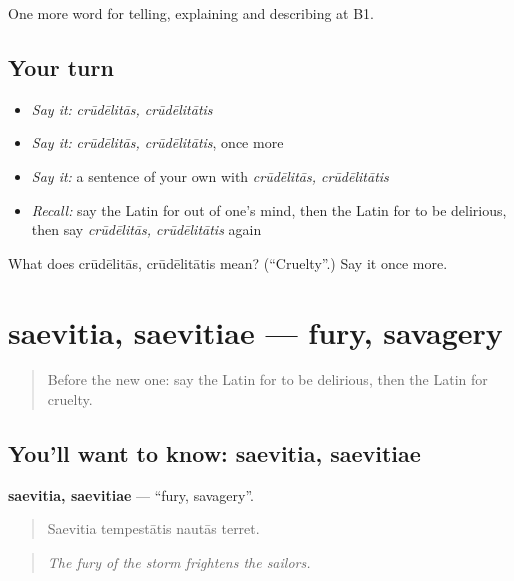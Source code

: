 \begin{grammarlens}[title={What you've built}]
One more word for telling, explaining and describing at B1.
\end{grammarlens}

\subsection*{Your turn}
\begin{itemize}
\raggedright
  \item \emph{Say it:} \emph{crūdēlitās, crūdēlitātis}
  \item \emph{Say it:} \emph{crūdēlitās, crūdēlitātis}, once more
  \item \emph{Say it:} a sentence of your own with \emph{crūdēlitās, crūdēlitātis}
  \item \emph{Recall:} say the Latin for out of one's mind, then the Latin for to be delirious, then say \emph{crūdēlitās, crūdēlitātis} again
\end{itemize}

\begin{tcolorbox}[breakable,colback=teal!4,colframe=teal!35!black,title={Before you move on}]
What does crūdēlitās, crūdēlitātis mean? (\textquotedblleft{}Cruelty\textquotedblright{}.) Say it once more.
\end{tcolorbox}
\section[saevitia, saevitiae]{saevitia, saevitiae — fury, savagery}

\label{lesson:LA-C511-saevitia}



\begin{quote}
Before the new one: say the Latin for to be delirious, then the Latin for cruelty.
\end{quote}

\subsection*{You'll want to know: saevitia, saevitiae}
\textbf{saevitia, saevitiae} — \textquotedblleft{}fury, savagery\textquotedblright{}.

\begin{quote}
Saevitia tempestātis nautās terret.
\end{quote}

\begin{quote}
\emph{The fury of the storm frightens the sailors.}
\end{quote}

